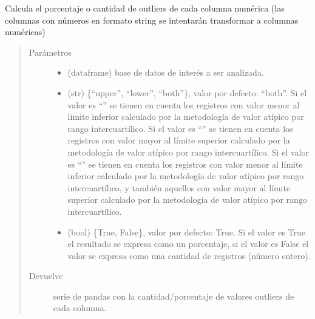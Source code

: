 \documentclass[letterpaper,10pt,openany,spanish]{sphinxmanual}
\begin{document}
\begin{fulllineitems}
\label{\detokenize{datos:datos.outliers}}
Calcula el porcentaje o cantidad de outliers de cada columna numérica (las columnas con números en formato string se intentarán transformar a columnas numéricas)
\begin{quote}\begin{description}
\item[{Parámetros}] \leavevmode\begin{itemize}
\item {} 
 \textendash{} (dataframe) base de datos de interés a ser analizada.

\item {} 
 \textendash{} (str) \{“upper”, “lower”, “both”\}, valor por defecto: “both”. Si el valor es “” se tienen en cuenta los registros con valor menor al límite inferior calculado por la metodología de valor atípico por rango intercuartílico. Si el valor es “” se tienen en cuenta los registros con valor mayor al límite superior calculado por la metodología de valor atípico por rango intercuartílico. Si el valor es “” se tienen en cuenta los registros con valor menor al límite inferior calculado por la metodología de valor atípico por rango intercuartílico, y también aquellos con valor mayor al límite superior calculado por la metodología de valor atípico por rango intercuartílico.

\item {} 
 \textendash{} (bool) \{True, False\}, valor por defecto: True. Si el valor es True el resultado se expresa como un porcentaje, si el valor es False el valor se expresa como una cantidad de registros (número entero).

\end{itemize}

\item[{Devuelve}] \leavevmode
serie de pandas con la cantidad/porcentaje de valores outliers de cada columna.

\end{description}\end{quote}

\end{fulllineitems}
\end{document}
